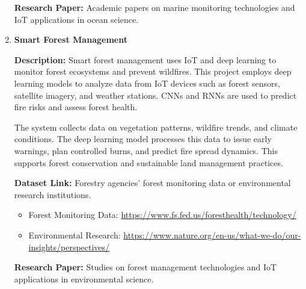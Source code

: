 \documentclass{article}
\begin{document}
\begin{enumerate}[label=\textbf{\arabic*.}, leftmargin=*]
\textbf{Research Paper:} Academic papers on marine monitoring technologies and IoT applications in ocean science.

\item \textbf{Smart Forest Management}

\textbf{Description:}
Smart forest management uses IoT and deep learning to monitor forest ecosystems and prevent wildfires. This project employs deep learning models to analyze data from IoT devices such as forest sensors, satellite imagery, and weather stations. CNNs and RNNs are used to predict fire risks and assess forest health.

The system collects data on vegetation patterns, wildfire trends, and climate conditions. The deep learning model processes this data to issue early warnings, plan controlled burns, and predict fire spread dynamics. This supports forest conservation and sustainable land management practices.

\textbf{Dataset Link:} Forestry agencies' forest monitoring data or environmental research institutions.
\begin{itemize}
    \item Forest Monitoring Data: \url{https://www.fs.fed.us/foresthealth/technology/}
    \item Environmental Research: \url{https://www.nature.org/en-us/what-we-do/our-insights/perspectives/}
\end{itemize}

\textbf{Research Paper:} Studies on forest management technologies and IoT applications in environmental science.

\end{enumerate}
\end{document}
